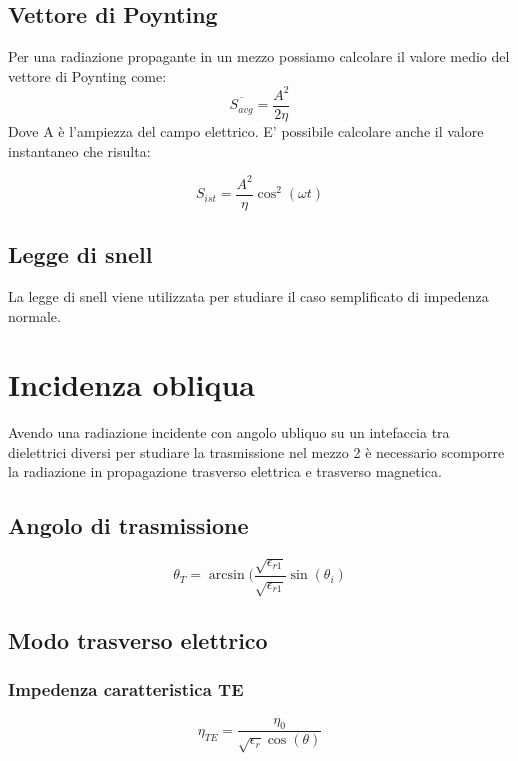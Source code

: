 \documentclass[10pt,a4paper]{report}
\begin{document}
	\section{Vettore di Poynting}
		Per una radiazione propagante in un mezzo possiamo calcolare il valore medio del vettore di Poynting come:
		\begin{equation}
		\overline{S_{avg}}=\frac{A^2}{2\eta}
		\end{equation}
		Dove A è l'ampiezza del campo elettrico.
		E' possibile calcolare anche il valore instantaneo che risulta:

		\begin{equation}
		S_{ist}=\frac{A^2}{\eta}\cos^2(\omega t)
		\end{equation}
	
	\section{Legge di snell}

	La legge di snell viene utilizzata per studiare il caso semplificato di impedenza normale.


\chapter{Incidenza obliqua}

	Avendo una radiazione incidente con angolo ubliquo su un intefaccia tra dielettrici diversi per studiare la trasmissione nel mezzo 2 è necessario scomporre la radiazione in propagazione trasverso elettrica e trasverso magnetica.

	\section{Angolo di trasmissione}

	\begin{equation}
	\theta_T=\arcsin(\frac{\sqrt{\epsilon_{r1}}}{\sqrt{\epsilon_{r1}}}\sin(\theta_i)
	\end{equation} 
	

	\section{Modo trasverso elettrico}

		\subsection{Impedenza caratteristica TE}
			\begin{equation}
			\eta_{TE}=\frac{\eta_0}{\sqrt{\epsilon_r}\cos(\theta)}
			\end{equation}
\end{document}
